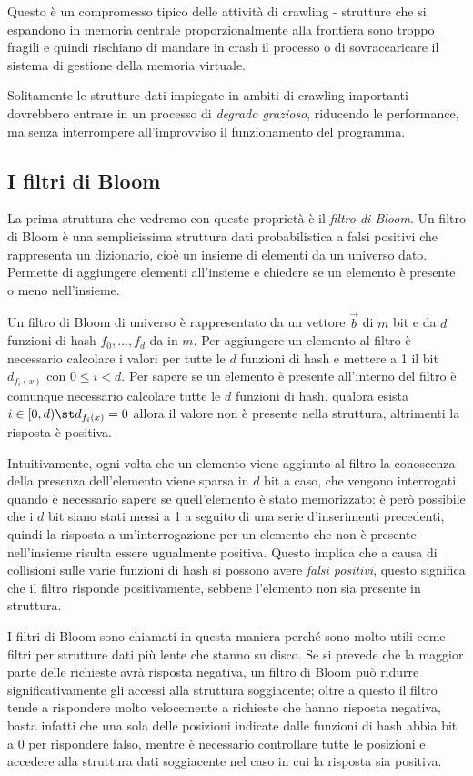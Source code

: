 Questo è un compromesso tipico delle attività di crawling - strutture che si espandono in memoria centrale proporzionalmente alla frontiera sono troppo fragili e quindi rischiano di mandare in crash il processo o di sovraccaricare il sistema di gestione della memoria virtuale.

Solitamente le strutture dati impiegate in ambiti di crawling importanti dovrebbero entrare in un processo di \textit{degrado grazioso}, riducendo le performance, ma senza interrompere all'improvviso il funzionamento del programma.
\subsection{I filtri di Bloom}
La prima struttura che vedremo con queste proprietà è il \textit{filtro di Bloom}. Un filtro di Bloom \cite{Bloom} è una semplicissima struttura dati probabilistica a falsi positivi che rappresenta un dizionario, cioè un insieme di elementi da un universo dato. Permette di aggiungere elementi all'insieme e chiedere se un elemento è presente o meno nell'insieme.

Un filtro di Bloom di universo  è rappresentato da un vettore $\vec{b}$ di $m$ bit e da $d$ funzioni di hash $f_0, \dots, f_d$ da  in $m$. Per aggiungere un elemento al filtro è necessario calcolare i valori per tutte le $d$ funzioni di hash e mettere a 1 il bit $d_{f_i(x)}$ con $0 \leq i < d$. Per sapere se un elemento è presente all'interno del filtro è comunque necessario calcolare tutte le $d$ funzioni di hash, qualora esista $i \in [0, d) \st d_{f_i(x)} = 0$ allora il valore non è presente nella struttura, altrimenti la risposta è positiva.

Intuitivamente, ogni volta che un elemento viene aggiunto al filtro la conoscenza della presenza dell'elemento viene sparsa in $d$ bit a caso, che vengono interrogati quando è necessario sapere se quell'elemento è stato memorizzato: è però possibile che i $d$ bit siano stati messi a 1 a seguito di una serie d'inserimenti precedenti, quindi la risposta a un'interrogazione per un elemento che non è presente nell'insieme risulta essere ugualmente positiva. Questo implica che a causa di collisioni sulle varie funzioni di hash si possono avere \textit{falsi positivi}, questo significa che il filtro risponde positivamente, sebbene l'elemento non sia presente in struttura.

I filtri di Bloom sono chiamati in questa maniera perché sono molto utili come filtri per strutture dati più lente che stanno su disco. Se si prevede che la maggior parte delle richieste avrà risposta negativa, un filtro di Bloom può ridurre significativamente gli accessi alla struttura soggiacente; oltre a questo il filtro tende a rispondere molto velocemente a richieste che hanno risposta negativa, basta infatti che una sola delle posizioni indicate dalle funzioni di hash abbia bit a 0 per rispondere falso, mentre è necessario controllare tutte le posizioni e accedere alla struttura dati soggiacente nel caso in cui la risposta sia positiva.


